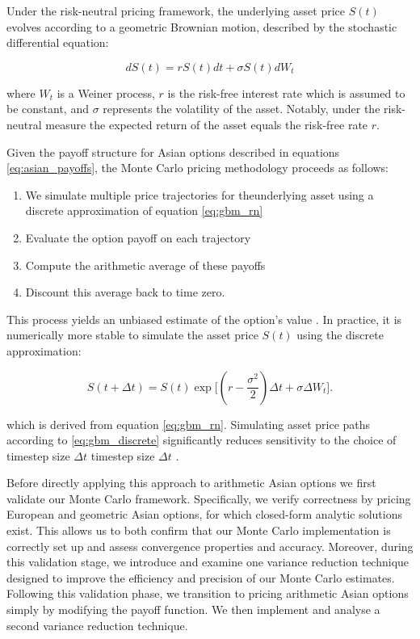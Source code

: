 Under the risk-neutral pricing framework, the underlying asset price $S(t)$ evolves according to a 
geometric Brownian motion, described by the stochastic differential equation:

\begin{equation}\label{eq:gbm_rn}
    dS(t) = r S(t) dt + \sigma S(t) dW_t
\end{equation}

where $W_t$ is a Weiner process, $r$ is the risk-free interest rate which is assumed to be constant, and $\sigma$ represents 
the volatility of the asset. Notably, under the risk-neutral measure the expected return of the asset equals the risk-free rate $r$. 

Given the payoff structure for Asian options described in equations \eqref{eq:asian_payoffs}, the Monte Carlo pricing methodology 
proceeds as follows: 
\begin{enumerate}\label{process:MC_algorithm}
    \item We simulate multiple price trajectories for theunderlying asset using a discrete approximation of equation \eqref{eq:gbm_rn}
    \item Evaluate the option payoff on each trajectory
    \item Compute the arithmetic average of these payoffs
    \item Discount this average back to time zero. 
\end{enumerate}

This process yields an unbiased estimate of the option's value \cite{hull2016options}. In practice, it is numerically more stable to 
simulate the asset price $S(t)$ using the discrete approximation:

\begin{equation}\label{eq:gbm_discrete}
    S(t + \Delta t) = S(t) \exp\bigg[(r - \frac{\sigma^2}{2})\Delta t + \sigma \Delta W_t\bigg].
\end{equation}

which is derived from equation \eqref{eq:gbm_rn}. Simulating asset price paths according to \eqref{eq:gbm_discrete} 
significantly reduces sensitivity to the choice of timestep size $\Delta t$ timestep size $\Delta t$ \cite{hull2016options}.

Before directly applying this approach to arithmetic Asian options we first validate our Monte Carlo framework. 
Specifically, we verify correctness by pricing European and geometric Asian options, for which closed-form analytic solutions exist.
This allows us to both confirm that our Monte Carlo implementation is correctly set up and assess convergence properties and accuracy. 
Moreover, during this validation stage, we introduce and examine one variance reduction technique designed to improve the efficiency and 
precision of our Monte Carlo estimates. Following this validation phase, we transition to pricing arithmetic Asian options simply by
modifying the payoff function. We then implement and analyse a second variance reduction technique.

